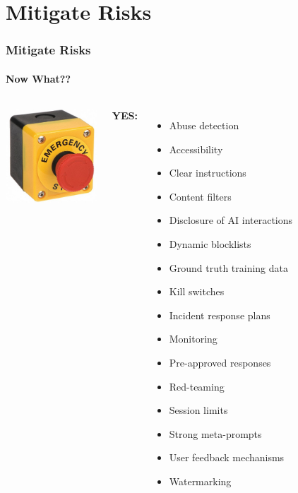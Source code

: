 \documentclass[11pt,
               aspectratio=169,
               hyperref={colorlinks}
               ]{beamer}
\begin{document}
	\section{Mitigate Risks}

		\begin{frame}
			
			\frametitle{Mitigate Risks}
			\framesubtitle{Now What??}
			
			\begin{columns}
				
					\vspace{5pt}
					\centering
					\includegraphics[height=100pt]{../img/buzzer.png}
				
					\textbf{YES:}
					\begin{itemize}\tiny
						\item Abuse detection
						\item Accessibility
						\item Clear instructions
						\item Content filters
						\item Disclosure of AI interactions
						\item Dynamic blocklists
						\item Ground truth training data
						\item Kill switches					
						\item Incident response plans
						\item Monitoring
						\item Pre-approved responses
						\item Red-teaming
						\item Session limits
						\item Strong meta-prompts
						\item User feedback mechanisms
						\item Watermarking
					\end{itemize}
			

\end{columns}
\end{frame}
\end{document}

